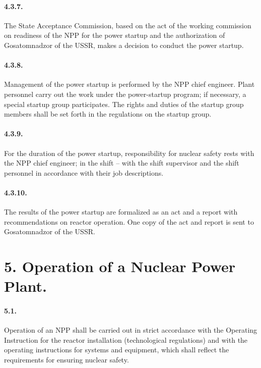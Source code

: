 \documentclass[openright]{bookest}
\begin{document}
\paragraph{4.3.7.} The State Acceptance Commission, based on the act of the working commission on readiness of the NPP for the power startup and the authorization of Gosatomnadzor of the USSR, makes a decision to conduct the power startup.

\paragraph{4.3.8.} Management of the power startup is performed by the NPP chief engineer. Plant personnel carry out the work under the power-startup program; if necessary, a special startup group participates. The rights and duties of the startup group members shall be set forth in the regulations on the startup group.

\paragraph{4.3.9.} For the duration of the power startup, responsibility for nuclear safety rests with the NPP chief engineer; in the shift -- with the shift supervisor and the shift personnel in accordance with their job descriptions.

\paragraph{4.3.10.} The results of the power startup are formalized as an act and a report with recommendations on reactor operation. One copy of the act and report is sent to Gosatomnadzor of the USSR.

\section*{5. Operation of a Nuclear Power Plant.}

\paragraph{5.1.} Operation of an NPP shall be carried out in strict accordance with the Operating Instruction for the reactor installation (technological regulations) and with the operating instructions for systems and equipment, which shall reflect the requirements for ensuring nuclear safety.
\end{document}
